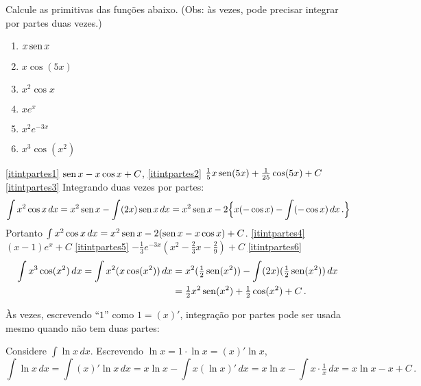 \begin{exo} Calcule as primitivas das funções abaixo. 
(Obs: às vezes, pode precisar integrar por partes duas vezes.)
\begin{multicols}{3}
\begin{enumerate}
\item\label{itintpartes1} $x\operatorname{sen} x$
\item\label{itintpartes2} $x\cos(5x)$
\item\label{itintpartes3} $x^2\cos x$
\item\label{itintpartes4} $xe^x$
\item\label{itintpartes5} $x^2e^{-3x}$
\item\label{itintpartes6} $x^3\cos (x^2)$
\end{enumerate}
\end{multicols}
\vspace{0.01cm}
\begin{sol}
\eqref{itintpartes1} $\operatorname{sen} x-x\cos x+C$,
\eqref{itintpartes2} $\frac{1}{5}x\operatorname{sen}(5x)+\frac{1}{25}\cos(5x)+C$
\eqref{itintpartes3} Integrando duas vezes por partes:
$$
\int x^2\cos x\,dx=x^2\operatorname{sen} x-\int (2x)\operatorname{sen} x\,dx=x^2\operatorname{sen} x-2\Bigl\{
x(-\cos x)-\int (-\cos x)\,dx\,.
\Bigr\}$$
Portanto $\int x^2\cos x\,dx=x^2\operatorname{sen} x-2(\operatorname{sen} x-x\cos x)+C$.
\eqref{itintpartes4} $(x-1)e^x+C$
\eqref{itintpartes5} $-\tfrac13 e^{-3x}(x^2-\tfrac23 x-\tfrac29)+C$
\eqref{itintpartes6} 
\begin{align*}
\int x^3\cos (x^2)\,dx=\int x^2 (x\cos(x^2))\,dx&=x^2(\tfrac12
\operatorname{sen}(x^2))-\int(2x)(\tfrac12 \operatorname{sen} (x^2))\,dx\,\\
&=\tfrac12 x^2 \operatorname{sen}(x^2)+\tfrac12 \cos (x^2)+C\,.
\end{align*}
\end{sol}
\end{exo}

Às vezes, escrevendo ``$1$'' como $1=(x)'$, integração por partes pode ser usada mesmo quando não tem duas partes:
\begin{ex}
Considere $\int \ln x\, dx$. Escrevendo $\ln x=1\cdot \ln x=(x)'\ln x$, 
$$
\int \ln x\,dx=\int (x)'\ln x\,dx=x\ln x-\int x(\ln x)'\,dx=x\ln x-\int x\cdot
\tfrac1x\,dx=x\ln x-x+C\,.
$$
\end{ex}

